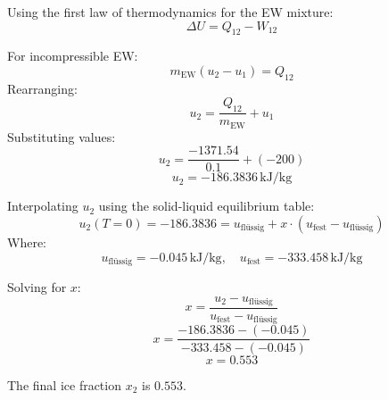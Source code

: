 Using the first law of thermodynamics for the EW mixture:  
\[
\Delta U = Q_{12} - W_{12}
\]  

For incompressible EW:  
\[
m_{\text{EW}} (u_2 - u_1) = Q_{12}
\]  
Rearranging:  
\[
u_2 = \frac{Q_{12}}{m_{\text{EW}}} + u_1
\]  
Substituting values:  
\[
u_2 = \frac{-1371.54}{0.1} + (-200)
\]  
\[
u_2 = -186.3836 \, \text{kJ/kg}
\]  

Interpolating \( u_2 \) using the solid-liquid equilibrium table:  
\[
u_2(T=0) = -186.3836 = u_{\text{flüssig}} + x \cdot (u_{\text{fest}} - u_{\text{flüssig}})
\]  
Where:  
\[
u_{\text{flüssig}} = -0.045 \, \text{kJ/kg}, \quad u_{\text{fest}} = -333.458 \, \text{kJ/kg}
\]  

Solving for \( x \):  
\[
x = \frac{u_2 - u_{\text{flüssig}}}{u_{\text{fest}} - u_{\text{flüssig}}}
\]  
\[
x = \frac{-186.3836 - (-0.045)}{-333.458 - (-0.045)}
\]  
\[
x = 0.553
\]  

The final ice fraction \( x_2 \) is \( 0.553 \).